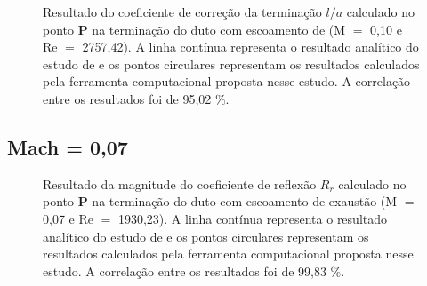 \newpage
\begin{figure}[ht!]
\centering
  \caption[Coeficiente de Correção da Terminação $l/a$ com Escoamento de Exaustão (M $=$ 0,10)]{Resultado do coeficiente de correção da terminação $l/a$ calculado no ponto $\textbf{P}$ na terminação do duto com escoamento de (M $=$ 0,10 e Re $=$ 2757,42). A linha contínua representa o resultado analítico do estudo de  e os pontos circulares representam os resultados calculados pela ferramenta computacional proposta nesse estudo. A correlação entre os resultados foi de 95,02 \%.}
  \label{fig:loa_boca_010}
\end{figure}


\newpage
\subsection{Mach = 0,07}

\begin{figure}[ht!]
\centering
  \caption[Coeficiente de Reflexão $R_{r}$ com Escoamento de Exaustão (M $=$ 0,07)]{Resultado da magnitude do coeficiente de reflexão $R_{r}$ calculado no ponto $\textbf{P}$ na terminação do duto com escoamento de exaustão (M $=$ 0,07 e Re $=$ 1930,23). A linha contínua representa o resultado analítico do estudo de  e os pontos circulares representam os resultados calculados pela ferramenta computacional proposta nesse estudo. A correlação entre os resultados foi de 99,83 \%.}
  \label{fig:abs_r_boca_007}
\end{figure}

